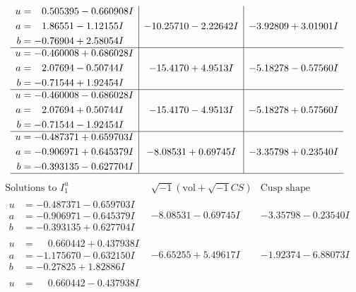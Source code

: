 \documentclass[1p]{elsarticle_modified}
\theoremstyle{definition}
\newcommand{\I}{\sqrt{-1}}
\begin{document}
$$\begin{array}{c|c|c}
\begin{aligned}
u &= \phantom{-}0.505395 - 0.660908 I \\
a &= \phantom{-}1.86551 - 1.12155 I \\
b &= -0.76904 + 2.58054 I\end{aligned}
 & -10.25710 - 2.22642 I & -3.92809 + 3.01901 I \\ \hline\begin{aligned}
u &= -0.460008 + 0.686028 I \\
a &= \phantom{-}2.07694 - 0.50744 I \\
b &= -0.71544 + 1.92454 I\end{aligned}
 & -15.4170 + 4.9513 I & -5.18278 - 0.57560 I \\ \hline\begin{aligned}
u &= -0.460008 - 0.686028 I \\
a &= \phantom{-}2.07694 + 0.50744 I \\
b &= -0.71544 - 1.92454 I\end{aligned}
 & -15.4170 - 4.9513 I & -5.18278 + 0.57560 I \\ \hline\begin{aligned}
u &= -0.487371 + 0.659703 I \\
a &= -0.906971 + 0.645379 I \\
b &= -0.393135 - 0.627704 I\end{aligned}
 & -8.08531 + 0.69745 I & -3.35798 + 0.23540 I\\
 \hline 
 \end{array}$$\newpage$$\begin{array}{c|c|c}  
\text{Solutions to }I^u_{1}& \I (\text{vol} + \sqrt{-1}CS) & \text{Cusp shape}\\
 \hline 
\begin{aligned}
u &= -0.487371 - 0.659703 I \\
a &= -0.906971 - 0.645379 I \\
b &= -0.393135 + 0.627704 I\end{aligned}
 & -8.08531 - 0.69745 I & -3.35798 - 0.23540 I \\ \hline\begin{aligned}
u &= \phantom{-}0.660442 + 0.437938 I \\
a &= -1.175670 - 0.632150 I \\
b &= -0.27825 + 1.82886 I\end{aligned}
 & -6.65255 + 5.49617 I & -1.92374 - 6.88073 I \\ \hline\begin{aligned}
u &= \phantom{-}0.660442 - 0.437938 I \\

\end{aligned}
\end{array}$$
\end{document}
